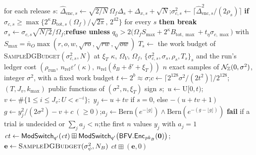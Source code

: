 \begin{algorithm}[p]
\begin{algorithmic}[1]
   
    \State for each release $s$: $\widehat\Delta_{\mathrm{enc},s}\gets\sqrt{2/N}\,\Omega_f\Delta_s+\Delta_{x,s}+\sqrt N$;\quad $\sigma_{c,s}^2\gets\lceil\widehat\Delta_{\mathrm{enc},s}^2/(2\rho_s)\rceil$
    \State \textbf{if} $\sigma_{c,s}\ge\max\{2^{\kappa}B_{\mathrm{tot},s}(\Omega_f)/\sqrt{2\pi},\,2^{42}\}$ for every $s$ \textbf{then break} 
  \EndFor {}
  \State $\sigma_s\gets\sigma_{c,s}\sqrt{N/2}/\Omega_f$;\quad \textbf{refuse unless} $q_0>2\bigl(\Omega_fS_{\max}+2^{\kappa}B_{\mathrm{tot},\max}+t_\eta\sigma_{c,\max}\bigr)$
  \Statex \hspace{\algorithmicindent}with $S_{\max}=\bar n_O\max(r,o,w,\sqrt{ro},\sqrt{rw},\sqrt{ow})$ 
  \State $T_s\gets$ the work budget of \textsc{SampleDGBudget}$(\sigma_{c,s}^2,N)$ at $\xi_T$ 
  \State \Return $\kappa$, $\Omega_V$, $\Omega_f$, $\{\sigma_{c,s}^2,\sigma_s,\rho_s,T_s\}_s$ and the run's ledger cost $(\rho_{\mathrm{run}},\ n_{\mathrm{rel}}\varepsilon'(\kappa),\ n_{\mathrm{rel}}(\delta_B+\delta'+\xi_T))$
\EndFunction
\Statex
{} $n$ exact samples of $\mathcal N_{\mathbb{Z}}(0,\sigma^2)$, integer $\sigma^2$, with a fixed work budget
  \State $t\gets2^b\approx\sigma$;\quad $c\gets\lceil2^{128}\sigma^2/(2t^2)\rceil/2^{128}$;\quad $(T,J_v,k_{\max})$ public functions of $(\sigma^2,n,\xi_T)$
   
    \State sign $s$;\ $u\gets\mathrm U[0,t)$;\ $v\gets\#\{1\le i\le J_v:U<e^{-i}\}$;\ $y_j\gets u+tv$ if $s=0$, else $-(u+tv+1)$
    \State $g\gets y_j^2/(2\sigma^2)-v+c\ (\ge0)$;\quad $a_j\gets\mathrm{Bern}(e^{-\lfloor g\rfloor})\wedge\mathrm{Bern}(e^{-(g-\lfloor g\rfloor)})$ 
  \EndFor
  \State \textbf{fail} if a trial is undecided or $\sum_ja_j<n$;\quad \Return the first $n$ values $y_j$ with $a_j=1$ 
\EndFunction
\Statex
{} 
  \State $\mathit{ct}\gets\mathsf{ModSwitch}_{q'}(\mathit{ct})\boxplus\mathsf{ModSwitch}_{q'}\bigl(\mathsf{BFV.Enc}_{\mathit{pk}_B}(\mathbf 0)\bigr)$;\quad $\mathbf e\gets\textsc{SampleDGBudget}(\sigma_\psi^2,N_B)$ 
  \State \Return $\mathit{ct}\boxplus(\mathbf e,0)$ 

\end{algorithmic}
\end{algorithm}
